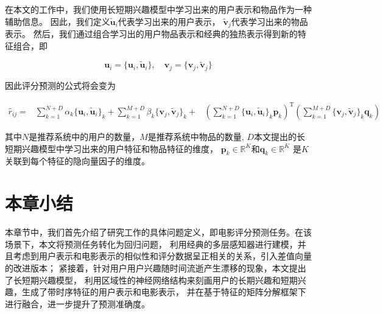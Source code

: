 在本文的工作中，我们使用长短期兴趣模型中学习出来的用户表示和物品作为一种辅助信息。
因此，我们定义$\tilde{\mathbf{u}}_i$代表学习出来的用户表示，
$\tilde{\mathbf{v}}_j$代表学习出来的物品表示。
然后，我们通过组合学习出的用户物品表示和经典的独热表示得到新的特征组合，即

\begin{equation}
\mathbf{u}_{i} = \{ \mathbf{u}_{i} , \tilde{\mathbf{u}}_i \} , \quad
\mathbf{v}_{j} = \{ \mathbf{v}_{j} , \tilde{\mathbf{v}}_j \}
\end{equation}

因此评分预测的公式将会变为

\begin{equation}
\begin{aligned}
\hat{r}_{ij} =
&\sum_{k=1}^{N+D} \alpha_k \{ \mathbf{u}_i , \tilde{\mathbf{u}}_i \}_k +
\sum_{k=1}^{M+D} \beta_k  \{ \mathbf{v}_j , \tilde{\mathbf{v}}_j \}_k + 
&\left( \sum_{k=1}^{N+D} \{ \mathbf{u}_i , \tilde{\mathbf{u}}_i \}_k \mathbf{p}_k \right) ^ \mathrm{T}
\left( \sum_{k=1}^{M+D} \{ \mathbf{v}_j , \tilde{\mathbf{v}}_j \}_k \mathbf{q}_k \right)
\end{aligned}
\end{equation}

其中$N$是推荐系统中的用户的数量，$M$是推荐系统中物品的数量,
$D$本文提出的长短期兴趣模型中学习出来的用户特征和物品特征的维度，
$\mathbf{p}_{k} \in \mathbb{R}^K$和$\mathbf{q}_{k} \in \mathbb{R}^K$
是$K$关联到每个特征的隐向量因子的维度。

\section{本章小结}
本章节中，我们首先介绍了研究工作的具体问题定义，即电影评分预测任务。在该场景下，本文将预测任务转化为回归问题，
利用经典的多层感知器进行建模，并且考虑到用户表示和电影表示的相似性和评分数据呈正相关的关系，引入差值向量的改进版本；
紧接着，针对用户用户兴趣随时间流逝产生漂移的现象，本文提出了长短期兴趣模型，
利用区域性的神经网络结构来刻画用户的长期兴趣和短期兴趣，生成了带时序特征的用户表示和电影表示，
并在基于特征的矩阵分解框架下进行融合，进一步提升了预测准确度。


